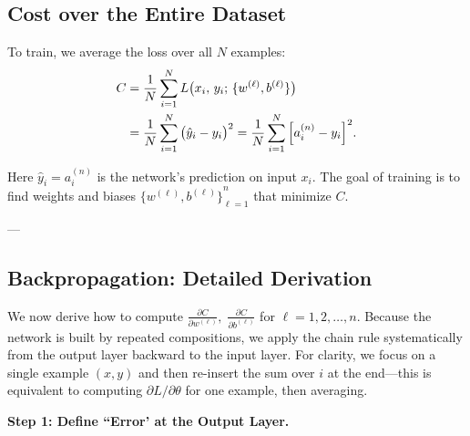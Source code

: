 \documentclass{article}
\begin{document}
\subsection{Cost over the Entire Dataset}\label{sec:nlayers-cost}

\noindent To train, we average the loss over all \(N\) examples:
\begin{align}
    C 
    &= \frac{1}{N}\sum_{i=1}^{N} L\bigl(x_i,\,y_i;\,\{w^{(\ell)},b^{(\ell)}\}\bigr) \nonumber\\
    &= \frac{1}{N}\sum_{i=1}^{N} {\bigl(\hat{y}_i - y_i\bigr)}^2 
    = \frac{1}{N}\sum_{i=1}^{N} {\Bigl[a_i^{(n)} - y_i\Bigr]}^2.
    \label{eq:nlayers-full-cost}
\end{align}

\noindent Here \(\hat{y}_i = a_i^{(n)}\) is the network's prediction on input \(x_i\).  The goal of training is to find weights and biases \({\{w^{(\ell)},b^{(\ell)}\}}_{\ell=1}^n\) that minimize \(C\).

---

\subsection{Backpropagation: Detailed Derivation}\label{sec:nlayers-backprop}

\noindent We now derive how to compute 
\(\displaystyle \frac{\partial C}{\partial w^{(\ell)}}, \; \frac{\partial C}{\partial b^{(\ell)}}\) 
for \(\ell = 1,2,\ldots,n\).  Because the network is built by repeated compositions, we apply the chain rule systematically from the output layer backward to the input layer.  For clarity, we focus on a single example \((x,y)\) and then re-insert the sum over \(i\) at the end—this is equivalent to computing \(\partial L/\partial\theta\) for one example, then averaging.

\vspace{0.5em}
\noindent \textbf{Step 1: Define ``Error' at the Output Layer.}
\end{document}
